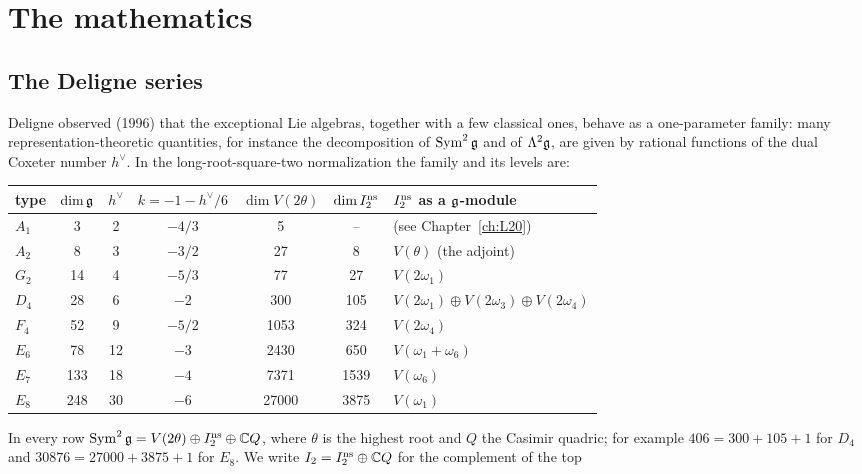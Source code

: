 \section{The mathematics}\label{l24:sec:math}

\subsection{The Deligne series}

Deligne observed (1996) that the exceptional Lie algebras, together with a few classical ones, behave
as a one-parameter family: many representation-theoretic quantities, for instance the decomposition of
$\operatorname{Sym}^2\mathfrak g$ and of $\Lambda^2\mathfrak g$, are given by rational functions of
the dual Coxeter number $h^\vee$. In the long-root-square-two normalization the family and its levels
are:
\begin{center}\small
\begin{tabular}{lcccccl}
\toprule
type & $\dim\mathfrak g$ & $h^\vee$ & $k=-1-h^\vee/6$ & $\dim V(2\theta)$ & $\dim I_2^{\mathrm{ns}}$ & $I_2^{\mathrm{ns}}$ as a $\mathfrak g$-module\\
\midrule
$A_1$ & 3 & 2 & $-4/3$ & 5 & -- & (see Chapter~\ref{ch:L20}) \\
$A_2$ & 8 & 3 & $-3/2$ & 27 & 8 & $V(\theta)$ (the adjoint)\\
$G_2$ & 14 & 4 & $-5/3$ & 77 & 27 & $V(2\omega_1)$\\
$D_4$ & 28 & 6 & $-2$ & 300 & 105 & $V(2\omega_1)\oplus V(2\omega_3)\oplus V(2\omega_4)$\\
$F_4$ & 52 & 9 & $-5/2$ & 1053 & 324 & $V(2\omega_4)$\\
$E_6$ & 78 & 12 & $-3$ & 2430 & 650 & $V(\omega_1+\omega_6)$\\
$E_7$ & 133 & 18 & $-4$ & 7371 & 1539 & $V(\omega_6)$\\
$E_8$ & 248 & 30 & $-6$ & 27000 & 3875 & $V(\omega_1)$\\
\bottomrule
\end{tabular}
\end{center}
In every row $\operatorname{Sym}^2\mathfrak g=V(2\theta)\oplus I_2^{\mathrm{ns}}\oplus{\mathbb{C}} Q$, where $\theta$
is the highest root and $Q$ the Casimir quadric; for example $406=300+105+1$ for $D_4$ and
$30876=27000+3875+1$ for $E_8$. We write $I_2=I_2^{\mathrm{ns}}\oplus{\mathbb{C}} Q$ for the complement of the top
